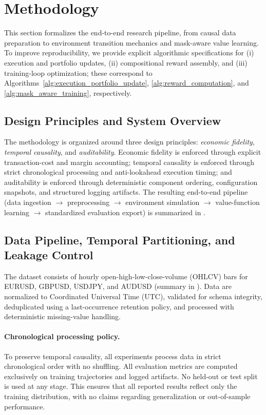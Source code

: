 \section{Methodology}\label{sec:methodology}

This section formalizes the end-to-end research pipeline, from causal data preparation to environment transition mechanics and mask-aware value learning. To improve reproducibility, we provide explicit algorithmic specifications for (i) execution and portfolio updates, (ii) compositional reward assembly, and (iii) training-loop optimization; these correspond to Algorithms~\ref{alg:execution_portfolio_update}, \ref{alg:reward_computation}, and \ref{alg:mask_aware_training}, respectively.

\subsection{Design Principles and System Overview}
The methodology is organized around three design principles: \emph{economic fidelity}, \emph{temporal causality}, and \emph{auditability}. Economic fidelity is enforced through explicit transaction-cost and margin accounting; temporal causality is enforced through strict chronological processing and anti-lookahead execution timing; and auditability is enforced through deterministic component ordering, configuration snapshots, and structured logging artifacts. The resulting end-to-end pipeline (data ingestion $\rightarrow$ preprocessing $\rightarrow$ environment simulation $\rightarrow$ value-function learning $\rightarrow$ standardized evaluation export) is summarized in .



\subsection{Data Pipeline, Temporal Partitioning, and Leakage Control}
The dataset consists of hourly open-high-low-close-volume (OHLCV) bars for EURUSD, GBPUSD, USDJPY, and AUDUSD (summary in ). Data are normalized to Coordinated Universal Time (UTC), validated for schema integrity, deduplicated using a last-occurrence retention policy, and processed with deterministic missing-value handling.


\paragraph{Chronological processing policy.}
To preserve temporal causality, all experiments process data in strict chronological order with no shuffling. All evaluation metrics are computed exclusively on training trajectories and logged artifacts. No held-out or test split is used at any stage. This ensures that all reported results reflect only the training distribution, with no claims regarding generalization or out-of-sample performance.

